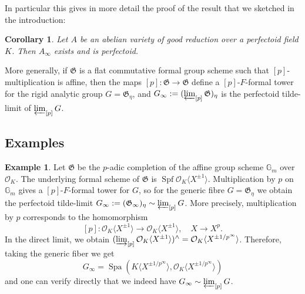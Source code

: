 \documentclass[10pt,oneside]{amsart}
\newtheorem{corollary}[theorem]{Corollary}
\theoremstyle{definition}
\newtheorem{remark}[theorem]{Remark}
\newtheorem*{example}{Example}
\begin{document}
In particular this gives in more detail the proof of the result that we sketched in the introduction:
	\begin{corollary}\label{tilde-limit exists and is perfectoid in the good reduction case}
		Let $A$ be an abelian variety of good reduction over a perfectoid field $K$. Then $A_\infty$ exists and is perfectoid.
	\end{corollary}
	 	
More generally, if $\mathfrak G$ is a flat commutative formal group scheme such that $[p]$-multiplication is affine, then the maps $[p]:\mathfrak G \rightarrow \mathfrak G$ define a $[p]$-$F$-formal tower for the rigid analytic group $G=\mathfrak G_\eta$, and  $G_\infty := (\varprojlim_{[p]}\mathfrak G)_\eta$ is the perfectoid tilde-limit of $\varprojlim_{[p]} G$. 

		
\subsection{Examples}				
		
	\begin{example}
		Let $\mathfrak G$ be the $p$-adic completion of the affine group scheme $\mathbb G_m$ over $\mathcal O_K$. The underlying formal scheme of $\mathfrak G$ is $\operatorname {Spf} \mathcal O_K\langle X^{\pm 1} \rangle$.  Multiplication by $p$ on $\mathbb G_m$ gives a $[p]$-$F$-formal tower for $G$, so for the generic fibre $G=\mathfrak G_\eta$ we obtain the perfectoid tilde-limit $G_\infty := (\mathfrak G_\infty)_{\eta} \sim \varprojlim_{[p]} G$. More precisely,  multiplication by $p$ corresponds to the homomorphism
		\[[p]:\mathcal O_K\langle X^{\pm 1} \rangle\rightarrow  \mathcal O_K\langle X^{\pm 1} \rangle, \quad X\rightarrow X^{p}.\]
		In the direct limit, we obtain $   (\varinjlim_{[p]} \mathcal O_K\langle X^{\pm 1} \rangle  )^{\wedge} = \mathcal O_K\langle  X^{\pm 1/p^\infty} \rangle$.  Therefore, taking the generic fiber we get
		$$G_\infty = \operatorname{Spa}(K\langle X^{\pm 1/p^\infty} \rangle,\mathcal O_K\langle X^{\pm 1/p^\infty} \rangle)$$
		and one can verify directly that we indeed have $G_\infty \sim \varprojlim_{[p]} G$.
	\end{example}
	
\end{document}
